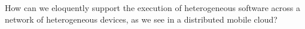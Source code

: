\begin{research-question}[Heterogeneity]

How can we eloquently support the execution of heterogeneous software
across a network of heterogeneous devices, as we see in a distributed
mobile cloud?

\end{research-question}
















